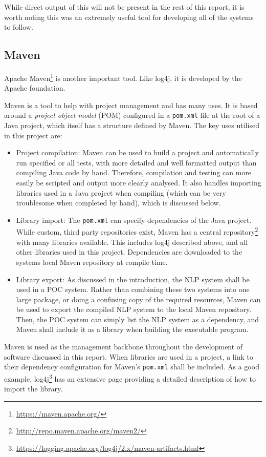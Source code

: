 While direct output of this will not be present in the rest of this report, it is worth noting this was an extremely useful tool for developing all of the systems to follow. 

\subsection*{Maven}
Apache Maven\footnote{\href{https://maven.apache.org/}{https://maven.apache.org/}} is another important tool. Like log4j, it is developed by the Apache foundation. 

Maven is a tool to help with project management and has many uses. It is based around a \textit{project object model} (POM) configured in a \texttt{pom.xml} file at the root of a Java project, which itself has a structure defined by Maven. The key uses utilised in this project are:
\begin{itemize}
	\item Project compilation: Maven can be used to build a project and automatically run specified or all tests, with more detailed and well formatted output than compiling Java code by hand. Therefore, compilation and testing can more easily be scripted and output more clearly analysed. It also handles importing libraries used in a Java project when compiling (which can be very troublesome when completed by hand), which is discussed below.
	\item Library import: The \texttt{pom.xml} can specify dependencies of the Java project. While custom, third party repositories exist, Maven has a central repository\footnote{\href{http://repo.maven.apache.org/maven2/}{http://repo.maven.apache.org/maven2/}} with many libraries available. This includes log4j described above, and all other libraries used in this project. Dependencies are downloaded to the systems local Maven repository at compile time.
	\item Library export: As discussed in the introduction, the NLP system shall be used in a POC system. Rather than combining these two systems into one large package, or doing a confusing copy of the required resources, Maven can be used to export the compiled NLP system to the local Maven repository. Then, the POC system can simply list the NLP system as a dependency, and Maven shall include it as a library when building the executable program.
\end{itemize}

Maven is used as the management backbone throughout the development of software discussed in this report. When libraries are used in a project, a link to their dependency configuration for Maven's \texttt{pom.xml} shall be included. As a good example, log4j\footnote{\href{https://logging.apache.org/log4j/2.x/maven-artifacts.html}{https://logging.apache.org/log4j/2.x/maven-artifacts.html}} has an extensive page providing a detailed description of how to import the library.

